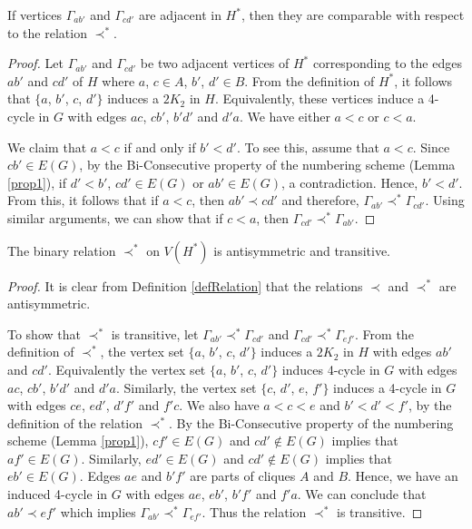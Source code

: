 \begin{claim}\label{claimAdjRel}
If vertices $\Gamma_{ab'}$ and $\Gamma_{cd'}$ are adjacent in $H^*$, then they are comparable with respect to the relation $\prec^*$.
\end{claim}
\begin{proof}
 Let $\Gamma_{ab'}$ and $\Gamma_{cd'}$ be two adjacent vertices of $H^*$ corresponding to the edges $ab'$ and $cd'$ of $H$ where $a$, $c \in A$, $b'$, $d' \in B$. 
From the definition of $H^*$, it follows that $\{a$, $b'$, $c$, $d'\}$ induces a $2K_2$ in $H$. Equivalently, these vertices induce a 4-cycle in $G$ with edges 
$ac$, $cb'$, $b'd'$ and $d'a$. We have either $a < c$ or $c < a$. 

We claim that $a < c$ if and only if $b' < d'$. To see this, assume that $a < c$. Since $cb' \in E(G)$, by the Bi-Consecutive property of 
the numbering scheme (Lemma \ref{prop1}), if $d' < b'$, $cd' \in E(G)$ or $ab' \in E(G)$, a contradiction. Hence, $b' < d'$. From this, 
it follows that if $a < c$, then $ab' \prec cd'$ and therefore, $\Gamma_{ab'} \prec^* \Gamma_{cd'}$. Using similar arguments, we can show that if $c < a$, 
then $\Gamma_{cd'} \prec^* \Gamma_{ab'}$. 
\end{proof}
\begin{claim}\label{claim3}
The binary relation $\prec^*$ on $V(H^*)$ is antisymmetric and transitive. 
\end{claim}
\begin{proof}
It is clear from Definition \ref{defRelation} that the relations $\prec$ and $\prec^*$ are antisymmetric.

To show that $\prec^*$ is transitive, let $\Gamma_{ab'} \prec^* \Gamma_{cd'}$ and $\Gamma_{cd'} \prec^* \Gamma_{ef'}$.  
From the definition of $\prec^*$, the vertex set $\{a$, $b'$, $c$, $d'\}$ induces a $2K_2$ in $H$ with edges $ab'$ and $cd'$. 
Equivalently the vertex set $\{a$, $b'$, $c$, $d'\}$ induces 4-cycle in $G$ with edges $ac$, $cb'$, $b'd'$ and $d'a$. Similarly, 
the vertex set $\{c$, $d'$, $e$, $f'\}$ induces a 4-cycle in $G$  with edges $ce$, $ed'$, $d'f'$ and $f'c$. We also have  $a<c<e$ and $b'<d'<f'$, 
by the definition of the relation $\prec^*$. By the Bi-Consecutive property of the numbering scheme (Lemma \ref{prop1}), $cf' \in E(G)$ and $cd' \notin E(G)$ implies that 
$af' \in E(G)$. Similarly, $ed' \in E(G)$ and $cd' \notin E(G)$ implies that $eb' \in E(G)$. Edges $ae$ and $b'f'$ are parts of cliques $A$ and $B$. 
Hence, we have an induced 4-cycle in $G$ with edges $ae$, $eb'$, $b'f'$ and $f'a$. We can conclude that $ab' \prec ef'$ which implies $\Gamma_{ab'} \prec^* \Gamma_{ef'}$. 
Thus the relation $\prec^*$ is transitive.
\end{proof}
